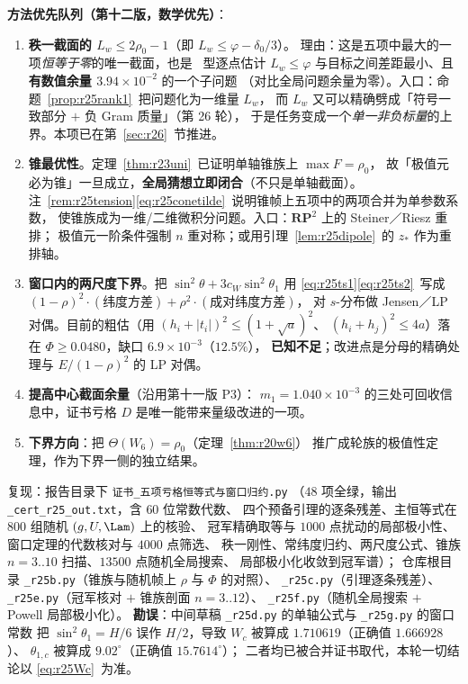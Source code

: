 \textbf{方法优先队列（第十二版，数学优先）}：
\begin{enumerate}\itemsep2pt
\item[\textbf{P1}] \textbf{秩一截面的 $L_w\le2\rho_0-1$}（即 $L_w\le\varphi-\delta_0/3$）。
理由：这是五项中最大的一项\emph{恒等于零}的唯一截面，也是 \STW\ 型逐点估计
$L_w\le\varphi$ 与目标之间差距最小、且\textbf{有数值余量 $3.94\times10^{-2}$} 的一个子问题
（对比全局问题余量为零）。入口：命题~\ref{prop:r25rank1}~把问题化为一维量 $L_w$，
而 $L_w$ 又可以精确劈成「符号一致部分 $+$ 负 Gram 质量」（第 26 轮），
于是任务变成一个\emph{单一非负标量}的上界。本项已在第~\ref{sec:r26}~节推进。
\item[\textbf{P2}] \textbf{锥最优性}。定理~\ref{thm:r23uni}~已证明单轴锥族上 $\max F=\rho_0$，
故「极值元必为锥」一旦成立，\textbf{全局猜想立即闭合}（不只是单轴截面）。
注~\ref{rem:r25tension}\eqref{eq:r25conetilde}~说明锥帧上五项中的两项合并为单参数系数，
使锥族成为一维/二维微积分问题。入口：$\mathbf{RP}^2$ 上的 Steiner／Riesz 重排；
极值元一阶条件强制 $n$ 重对称；或用引理~\ref{lem:r25dipole}~的 $z_*$ 作为重排轴。
\item[\textbf{P3}] \textbf{窗口内的两尺度下界}。把
$\sin^2\theta+3c_W\sin^2\theta_1$ 用 \eqref{eq:r25ts1}\eqref{eq:r25ts2}~写成
$(1-\rho)^2\cdot(\text{纬度方差})+\rho^2\cdot(\text{成对纬度方差})$，
对 $s$-分布做 Jensen／LP 对偶。目前的粗估（用 $(h_i+|t_i|)^2\le(1+\sqrt a)^2$、
$(h_i+h_j)^2\le4a$）落在 $\Phi\ge0.0480$，缺口 $6.9\times10^{-3}$（$12.5\%$），
\textbf{已知不足}；改进点是分母的精确处理与 $E/(1-\rho)^2$ 的 LP 对偶。
\item[\textbf{P4}] \textbf{提高中心截面余量}（沿用第十一版 P3）：
$m_1=1.040\times10^{-3}$ 的三处可回收信息中，证书亏格 $D$ 是唯一能带来量级改进的一项。
\item[\textbf{副}] \textbf{下界方向}：把 $\Theta(W_6)=\rho_0$（定理~\ref{thm:r20w6}）
推广成轮族的极值性定理，作为下界一侧的独立结果。
\end{enumerate}

复现：报告目录下 \texttt{证书\_五项亏格恒等式与窗口归约.py}
（$48$ 项全绿，输出 \texttt{\_cert\_r25\_out.txt}，含 $60$ 位常数代数、
四个预备引理的逐条残差、主恒等式在 $800$ 组随机 $(g,U,\Lam)$ 上的核验、
冠军精确取等与 $1000$ 点扰动的局部极小性、窗口定理的代数核对与 $4000$ 点筛选、
秩一刚性、常纬度归约、两尺度公式、锥族 $n=3..10$ 扫描、$13500$ 点随机全局搜索、
局部极小化收敛到冠军谱）；
仓库根目录 \texttt{\_r25b.py}（锥族与随机帧上 $\rho$ 与 $\Phi$ 的对照）、
\texttt{\_r25c.py}（引理逐条残差）、\texttt{\_r25e.py}（冠军核对 $+$ 锥族剖面 $n=3..12$）、
\texttt{\_r25f.py}（随机全局搜索 $+$ Powell 局部极小化）。
\textbf{勘误}：中间草稿 \texttt{\_r25d.py} 的单轴公式与 \texttt{\_r25g.py} 的窗口常数
把 $\sin^2\theta_1=H/6$ 误作 $H/2$，导致 $W_c$ 被算成 $1.710619$（正确值 $1.666928$）、
$\theta_{1,c}$ 被算成 $9.02^\circ$（正确值 $15.7614^\circ$）；
二者均已被合并证书取代，本轮一切结论以 \eqref{eq:r25Wc}~为准。
